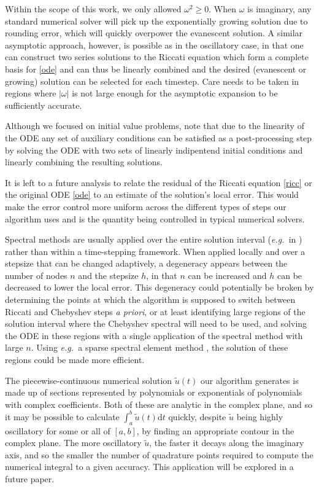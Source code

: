 \documentclass[10pt]{article}
\newcommand{\eg}{{\it e.g.\ }}
\newcommand{\om}{\omega}
\begin{document}
Within the scope of this work, we only allowed $\om^2 \geq 0$. When $\om$ is
imaginary, any standard numerical solver will pick up the exponentially growing
solution due to rounding error, which will quickly overpower the evanescent
solution. A similar asymptotic approach, however, is possible as in the
oscillatory case, in that one can construct two series solutions to the Riccati
equation which form a complete basis for \cref{ode} and can thus be linearly
combined and the desired (evanescent or growing) solution can be selected for
each timestep. Care needs to be taken in regions where $|\om|$ is not large
enough for the asymptotic expansion to be sufficiently accurate.

Although we focused on initial value problems, note that due to the linearity
of the ODE any set of auxiliary conditions can be satisfied as a
post-processing step by solving the ODE with two sets of linearly indipentend
initial conditions and linearly combining the resulting solutions.

It is left to a future analysis to relate the residual of the Riccati equation
\cref{ricc} or the original ODE \cref{ode} to an estimate of the solution's
local error. This would make the error control more uniform across the
different types of steps our algorithm uses and is the quantity being
controlled in typical numerical solvers.  

Spectral methods are usually applied over the entire solution interval (\eg in
\cite{driscoll2008}) rather than within a time-stepping framework. When applied
locally and over a stepsize that can be changed adaptively, a degeneracy
appears between the number of nodes $n$ and the stepsize $h$, in that $n$ can
be increased and $h$ can be decreased to lower the local error. This degeneracy
could potentially be broken by determining the points at which the algorithm is
supposed to switch between Riccati and Chebyshev steps \emph{a priori}, or at
least identifying large regions of the solution interval where the Chebyshev
spectral will need to be used, and solving the ODE in these regions with a
single application of the spectral method with large $n$. Using \eg a sparse
spectral element method \cite{fortunato2021}, the solution of these regions
could be made more efficient.

The piecewise-continuous numerical solution $\tilde{u}(t)$ our algorithm generates is made up
of sections represented by polynomials or exponentials of polynomials with
complex coefficients. Both of these are analytic in the complex plane, and so
it may be possible to calculate $\int_a^b \tilde{u}(t)\mathrm{d}t$ quickly,
despite $\tilde{u}$ being highly oscillatory for some or all of $[a, b]$, by
finding an appropriate contour in the complex plane. The more oscillatory
$\tilde{u}$, the faster it decays along the imaginary axis, and so the smaller
the number of quadrature points required to compute the numerical integral to a
given accuracy. This application will be explored in a future paper.
\end{document}
